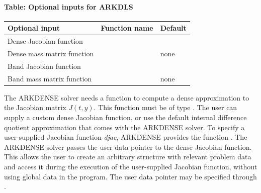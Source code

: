 \documentclass[letterpaper,10pt,english]{sphinxmanual}
\begin{document}
\paragraph{Table: Optional inputs for ARKDLS}
\label{c_interface/User_callable:table-optional-inputs-for-arkdls}
\begin{tabulary}{\linewidth}{|L|L|L|}
\hline
\textbf{
Optional input
} & \textbf{
Function name
} & \textbf{
Default
}\\\hline

Dense Jacobian function
 & 
{\hyperref[c_interface/User_callable:ARKDlsSetDenseJacFn]{}}
 & 
\\\hline

Dense mass matrix function
 & 
{\hyperref[c_interface/User_callable:ARKDlsSetDenseMassFn]{}}
 & 
none
\\\hline

Band Jacobian function
 & 
{\hyperref[c_interface/User_callable:ARKDlsSetBandJacFn]{}}
 & 
\\\hline

Band mass matrix function
 & 
{\hyperref[c_interface/User_callable:ARKDlsSetBandMassFn]{}}
 & 
none
\\\hline
\end{tabulary}


The ARKDENSE solver needs a function to compute a dense approximation
to the Jacobian matrix $J(t,y)$. This function must be of type
{\hyperref[c_interface/User_supplied:ARKDlsDenseJacFn]{}}.  The user can supply a custom dense
Jacobian function, or use the default internal difference quotient
approximation that comes with the ARKDENSE solver.  To specify a
user-supplied Jacobian function \emph{djac}, ARKDENSE provides the
function {\hyperref[c_interface/User_callable:ARKDlsSetDenseJacFn]{}}. The ARKDENSE solver
passes the user data pointer to the dense Jacobian function. This
allows the user to create an arbitrary structure with relevant problem
data and access it during the execution of the user-supplied Jacobian
function, without using global data in the program. The user
data pointer may be specified through {\hyperref[c_interface/User_callable:ARKodeSetUserData]{}}.
\end{document}
